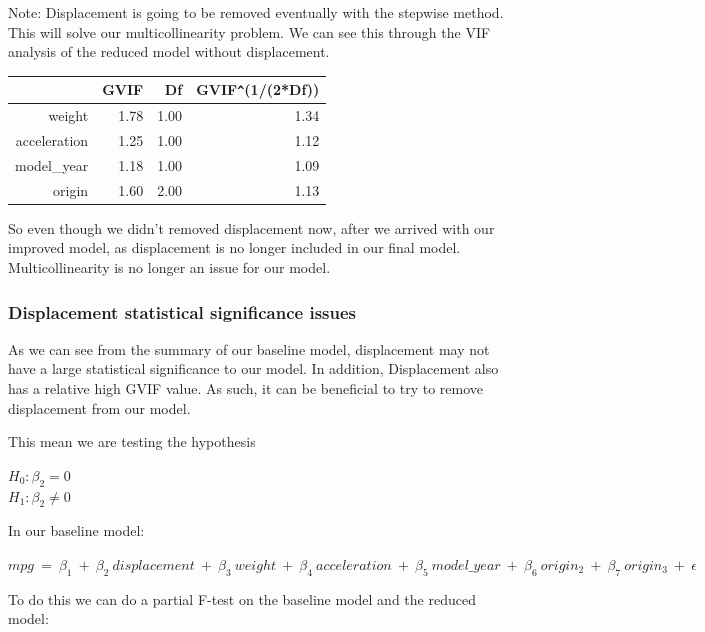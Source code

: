 Note: Displacement is going to be removed eventually with the stepwise method. This will solve our multicollinearity problem. We can see this through the VIF analysis of the reduced model without displacement.

\begin{table}[ht]
\centering
{}
\begin{tabular}{rrrr}
  \hline
 & GVIF & Df & GVIF\verb|^|(1/(2*Df)) \\ 
  \hline
  weight & 1.78 & 1.00 & 1.34 \\ 
  acceleration & 1.25 & 1.00 & 1.12 \\ 
  model\_year & 1.18 & 1.00 & 1.09 \\ 
  origin & 1.60 & 2.00 & 1.13 \\ 
   \hline
\end{tabular}
\end{table}

So even though we didn't removed displacement now, after we arrived with our improved model, as displacement is no longer included in our final model. Multicollinearity is no longer an issue for our model.

\subsubsection{Displacement statistical significance issues}

As we can see from the summary of our baseline model, displacement may not have a large statistical significance to our model. In addition, Displacement also has a relative high GVIF value. As such, it can be beneficial to try to remove displacement from our model.

This mean we are testing the hypothesis

\begin{center}
    $H_0: \beta_2 = 0$
    \\
    $H_1:\beta_2 \neq 0$
\end{center}

In our baseline model: 

\begin{center}
$
mpg \ = \ \beta_1 \ + \ \beta_2 \ displacement \ + \ \beta_3 \ weight \ + \ \beta_4 \ acceleration \ + \ \beta_5 \ model\_year \ + \ \beta_6 \ origin_2 \ + \ \beta_7 \ origin_3 \ + \ \epsilon
$
\end{center}


To do this we can do a partial F-test on the baseline model and the reduced model:

